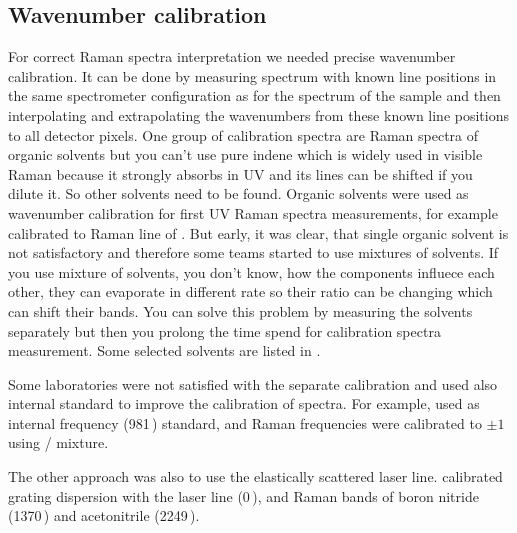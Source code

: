 \subsection{Wavenumber calibration}
\label{wavenumber_calibration}

For correct Raman spectra interpretation we needed precise wavenumber
calibration. It can be done by measuring spectrum with known line positions
in the same spectrometer configuration as for the spectrum of the sample and
then interpolating and extrapolating the wavenumbers from these known line
positions to all detector pixels. One group of calibration spectra are Raman
spectra of organic solvents but you can't use pure indene which is widely
used in visible Raman because it strongly absorbs in UV and its lines can be
shifted if you dilute it. So other solvents need to be found. Organic
solvents were used as wavenumber calibration for first UV Raman spectra
measurements, for example \textcite{Harada1975} calibrated to Raman line of
. But early, it was clear, that single organic solvent is not
satisfactory and therefore some teams started to use mixtures of solvents.
If you use mixture of solvents, you don't know, how the components influece
each other, they can evaporate in different rate so their ratio can be
changing which can shift their bands. You can solve this problem by measuring
the solvents separately but then you prolong the time spend for calibration
spectra measurement. Some selected solvents are listed in
.

\begin{table}
	\centering
	
	\caption{%
		Selection of organic solvents which were used for UV Raman spectra
		wavenumber calibration in literature.%
	}
	\label{\tablabel{wavenumber_calibration:solvents}}
\end{table}

Some laboratories were not satisfied with the separate calibration and used
also internal standard to improve the calibration of spectra. For example,
\textcite{Wen1998} used  as internal frequency (981\,\icm) standard,
and Raman frequencies were calibrated to $\pm1 $\,\icm{} using
/ mixture.

The other approach was also to use the elastically scattered laser line.
 \textcite{Kumamoto2012} calibrated grating dispersion with the laser line
(0\,\icm), and Raman bands of boron nitride (1370\,\icm) and acetonitrile
(2249\,\icm).

